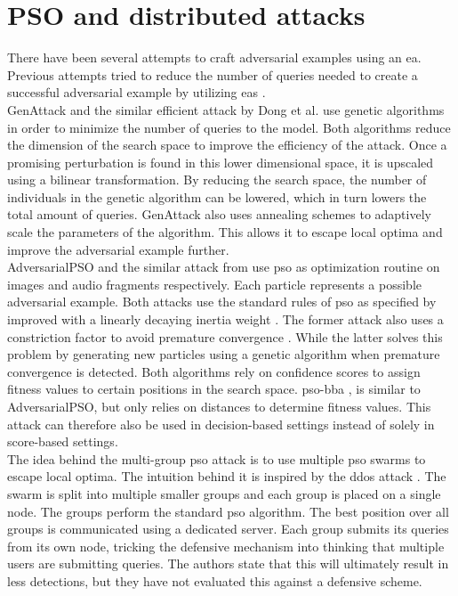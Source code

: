 \section{PSO and distributed attacks}\label{sec:pso_and_distributed_attacks}
There have been several attempts to craft adversarial examples using an \gls{ea}. Previous attempts tried to reduce the number of queries needed to create a successful adversarial example by utilizing \glspl{ea} \cite{genattack,dong2019efficient,mosli2019they,audio_pso,distributed_pso_attack,suryanto2020}. \\

GenAttack \cite{genattack} and the similar efficient attack by Dong et al. \cite{dong2019efficient} use genetic algorithms in order to minimize the number of queries to the model. Both algorithms reduce the dimension of the search space to improve the efficiency of the attack. Once a promising perturbation is found in this lower dimensional space, it is upscaled using a bilinear transformation. By reducing the search space, the number of individuals in the genetic algorithm can be lowered, which in turn lowers the total amount of queries. GenAttack also uses annealing schemes to adaptively scale the parameters of the algorithm. This allows it to escape local optima and improve the adversarial example further. \\

AdversarialPSO \cite{mosli2019they} and the similar attack from \cite{audio_pso} use \gls{pso} as optimization routine on images and audio fragments respectively. Each particle represents a possible adversarial example. Both attacks use the standard rules of \gls{pso} as specified by \cite{pso} improved with a linearly decaying inertia weight \cite{inertia_weight}. The former attack also uses a constriction factor to avoid premature convergence \cite{constriction_factor}. While the latter solves this problem by generating new particles using a genetic algorithm when premature convergence is detected. Both algorithms rely on confidence scores to assign fitness values to certain positions in the search space. \gls{pso}-\gls{bba} \cite{distributed_pso_attack}, is similar to AdversarialPSO, but only relies on distances to determine fitness values. This attack can therefore also be used in decision-based settings instead of solely in score-based settings.\\

The idea behind the multi-group \gls{pso} attack \cite{suryanto2020} is to use multiple \gls{pso} swarms to escape local optima. The intuition behind it is inspired by the \gls{ddos} attack \cite{ddos}. The swarm is split into multiple smaller groups and each group is placed on a single node. The groups perform the standard \gls{pso} algorithm. The best position over all groups is communicated using a dedicated server. Each group submits its queries from its own node, tricking the defensive mechanism into thinking that multiple users are submitting queries. The authors state that this will ultimately result in less detections, but they have not evaluated this against a defensive scheme.\\
